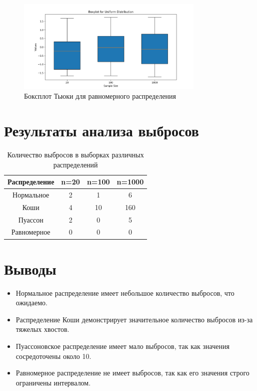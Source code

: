 \documentclass[a4paper]{article}
\begin{document}
    \begin{figure}[H]
        \centering
        \includegraphics[width=0.8\textwidth]{./plots/uniform_boxplot}
        \caption{Боксплот Тьюки для равномерного распределения}
        \label{fig:uniform_boxplot}
    \end{figure}


    \section{Результаты анализа выбросов}\label{sec:outliers}
    \begin{table}[!htbp]
        \centering
        \caption{Количество выбросов в выборках различных распределений}
        \begin{tabular}{|c|c|c|c|}
            \hline
            \textbf{Распределение} & \textbf{n=20} & \textbf{n=100} & \textbf{n=1000} \\
            \hline
            Нормальное             & 2             & 1              & 6               \\
            \hline
            Коши                   & 4             & 10             & 160             \\
            \hline
            Пуассон                & 2             & 0              & 5               \\
            \hline
            Равномерное            & 0             & 0              & 0               \\
            \hline
        \end{tabular}
        \label{tab:outliers}
    \end{table}


    \section{Выводы}\label{sec:conclusions}
    \begin{itemize}
        \item Нормальное распределение имеет небольшое количество выбросов, что ожидаемо.
        \item Распределение Коши демонстрирует значительное количество выбросов из-за тяжелых хвостов.
        \item Пуассоновское распределение имеет мало выбросов, так как значения сосредоточены около 10.
        \item Равномерное распределение не имеет выбросов, так как его значения строго ограничены интервалом.
    \end{itemize}
\end{document}
